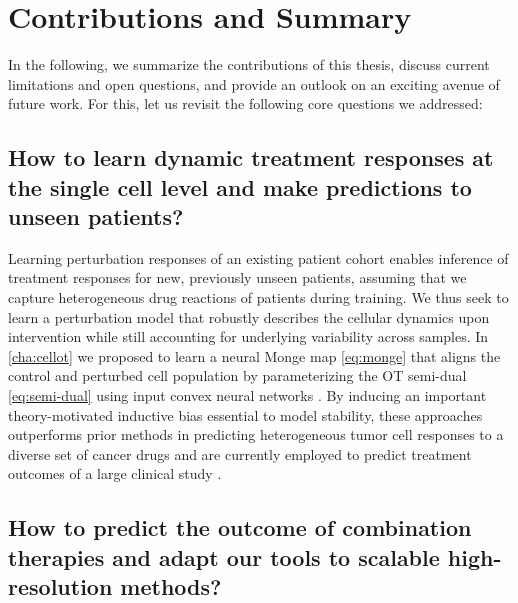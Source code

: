 \section*{Contributions and Summary}

In the following, we summarize the contributions of this thesis, discuss current limitations and open questions, and provide an outlook on an exciting avenue of future work.
For this, let us revisit the following core questions we addressed:

\subsection*{\textbf{How to learn dynamic treatment responses at the single cell level and make predictions to unseen patients?}}

 Learning perturbation responses of an existing patient cohort enables inference of treatment responses for new, previously unseen patients, assuming that we capture heterogeneous drug reactions of patients during training.
We thus seek to learn a perturbation model that robustly describes the cellular dynamics upon intervention while still accounting for underlying variability across samples.
In \cref{cha:cellot} we proposed to learn a neural Monge map \eqref{eq:monge} that aligns the control and perturbed cell population by parameterizing the OT semi-dual \eqref{eq:semi-dual} using input convex neural networks \citep{bunne2021learning, makkuva2020optimal, amos2017input}.
By inducing an important theory-motivated inductive bias essential to model stability, these approaches outperforms prior methods in predicting heterogeneous tumor cell responses to a diverse set of cancer drugs and are currently employed to predict treatment outcomes of a large clinical study \citep{irmisch2021tumor}.

\subsection*{\textbf{How to predict the outcome of combination therapies and adapt our tools to scalable high-resolution methods?}}

